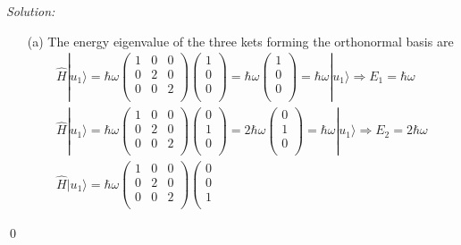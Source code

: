 \documentclass[12pt,a4paper]{article}
\newenvironment{sol}
    {\emph{Solution:}
    }
    {
    \qed
    }
\begin{document}
\begin{sol}
\begin{itemize}
\item[(a)] The energy eigenvalue of the three kets forming the orthonormal basis are
\begin{gather}
\hat{H}|u_1\rangle=\hbar\omega\left(\begin{array}{ccc}
1&0&0\\
0&2&0\\
0&0&2\\
\end{array}\right)\left(\begin{array}{c}
1\\
0\\
0\\
\end{array}\right)=\hbar\omega\left(\begin{array}{c}
1\\
0\\
0\\
\end{array}\right)=\hbar\omega|u_1\rangle\Longrightarrow E_1=\hbar\omega\\
\hat{H}|u_1\rangle=\hbar\omega\left(\begin{array}{ccc}
1&0&0\\
0&2&0\\
0&0&2\\
\end{array}\right)\left(\begin{array}{c}
0\\
1\\
0\\
\end{array}\right)=2\hbar\omega\left(\begin{array}{c}
0\\
1\\
0\\
\end{array}\right)=\hbar\omega|u_1\rangle\Longrightarrow E_2=2\hbar\omega\\
\hat{H}|u_1\rangle=\hbar\omega\left(\begin{array}{ccc}
1&0&0\\
0&2&0\\
0&0&2\\
\end{array}\right)\left(\begin{array}{c}
0\\
0\\
1\\

\end{array}
\end{gather}
\end{itemize}
\end{sol}
\end{document}
